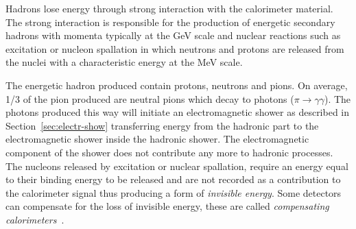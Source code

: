 Hadrons lose energy through strong interaction with the calorimeter
material. The strong interaction is responsible for the production of energetic
secondary hadrons with momenta typically at the GeV scale and nuclear reactions
such as excitation or nucleon spallation in which neutrons and protons are
released from the nuclei with a characteristic energy at the MeV scale.

The energetic hadron produced contain protons, neutrons and pions. On average,
1/3 of the pion produced are neutral pions which decay to photons
($\pi \rightarrow \gamma \gamma$). The photons produced this way will initiate
an electromagnetic shower as described in Section~\ref{sec:electr-show}
transferring energy from the hadronic part to the electromagnetic shower inside
the hadronic shower. The electromagnetic component of the shower does not
contribute any more to hadronic processes. The nucleons released by excitation
or nuclear spallation, require an energy equal to their binding energy to be
released and are not recorded as a contribution to the calorimeter signal thus
producing a form of \emph{invisible energy}. Some detectors can compensate for
the loss of invisible energy, these are called \emph{compensating
  calorimeters}~\cite{Calorimetry}.
